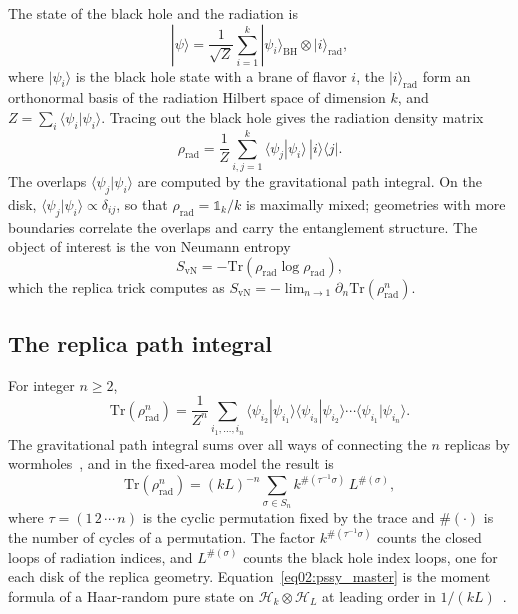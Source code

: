 \documentclass[11pt,letterpaper]{article}
\theoremstyle{plain}
\theoremstyle{definition}
\theoremstyle{remark}
\begin{document}
The state of the black hole and the radiation is
\begin{equation}
\label{eq02:psi_state}
|\psi\rangle = \frac{1}{\sqrt{Z}} \sum_{i=1}^{k} |\psi_i\rangle_{\mathrm{BH}} \otimes |i\rangle_{\mathrm{rad}},
\end{equation}
where $|\psi_i\rangle$ is the black hole state with a brane of flavor $i$, the $|i\rangle_{\mathrm{rad}}$ form an orthonormal basis of the radiation Hilbert space of dimension $k$, and $Z = \sum_i \langle\psi_i|\psi_i\rangle$. Tracing out the black hole gives the radiation density matrix
\begin{equation}
\label{eq02:rho_rad}
\rho_{\mathrm{rad}} = \frac{1}{Z} \sum_{i,j=1}^{k} \langle\psi_j|\psi_i\rangle \, |i\rangle\langle j|.
\end{equation}
The overlaps $\langle\psi_j|\psi_i\rangle$ are computed by the gravitational path integral. On the disk, $\langle\psi_j|\psi_i\rangle \propto \delta_{ij}$, so that $\rho_{\mathrm{rad}} = \mathbb{1}_k/k$ is maximally mixed; geometries with more boundaries correlate the overlaps and carry the entanglement structure. The object of interest is the von Neumann entropy
\begin{equation}
\label{eq02:svn_def}
S_{\mathrm{vN}} = -\mathrm{Tr}(\rho_{\mathrm{rad}} \log \rho_{\mathrm{rad}}),
\end{equation}
which the replica trick computes as $S_{\mathrm{vN}} = -\lim_{n \to 1} \partial_n \mathrm{Tr}(\rho_{\mathrm{rad}}^n)$.

\subsection{The replica path integral}
\label{subsec02:replica}

For integer $n \geq 2$,
\begin{equation}
\label{eq02:trace_rho_n}
\mathrm{Tr}(\rho_{\mathrm{rad}}^n) = \frac{1}{Z^n} \sum_{i_1, \ldots, i_n} \langle\psi_{i_2}|\psi_{i_1}\rangle \langle\psi_{i_3}|\psi_{i_2}\rangle \cdots \langle\psi_{i_1}|\psi_{i_n}\rangle .
\end{equation}
The gravitational path integral sums over all ways of connecting the $n$ replicas by wormholes~\citep{almheirietal2020,pssyetal2022}, and in the fixed-area model the result is~\citep{pssyetal2022}
\begin{equation}
\label{eq02:pssy_master}
\mathrm{Tr}(\rho_{\mathrm{rad}}^n) = (kL)^{-n} \sum_{\sigma \in S_n} k^{\#(\tau^{-1}\sigma)} \, L^{\#(\sigma)},
\end{equation}
where $\tau = (1\,2\,\cdots\,n)$ is the cyclic permutation fixed by the trace and $\#(\cdot)$ is the number of cycles of a permutation. The factor $k^{\#(\tau^{-1}\sigma)}$ counts the closed loops of radiation indices, and $L^{\#(\sigma)}$ counts the black hole index loops, one for each disk of the replica geometry. Equation~\eqref{eq02:pssy_master} is the moment formula of a Haar-random pure state on $\mathcal{H}_k \otimes \mathcal{H}_L$ at leading order in $1/(kL)$~\citep{lubkin1978,lloydpagels1988,page1993entropy}.
\end{document}
